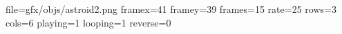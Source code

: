 file=gfx/objs/astroid2.png
framex=41
framey=39
frames=15
rate=25
rows=3
cols=6
playing=1
looping=1
reverse=0